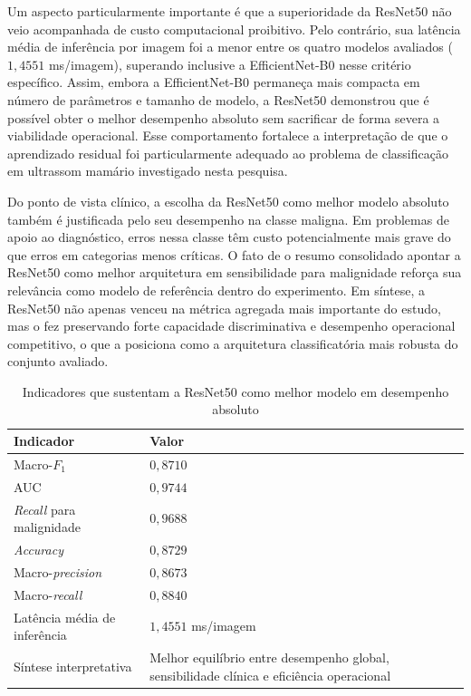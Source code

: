 \documentclass[tcc,capa]{texufpel}
\begin{document}
Um aspecto particularmente importante é que a superioridade da ResNet50 não veio acompanhada de custo computacional proibitivo. Pelo contrário, sua latência média de inferência por imagem foi a menor entre os quatro modelos avaliados (\(1{,}4551\) ms/imagem), superando inclusive a EfficientNet-B0 nesse critério específico. Assim, embora a EfficientNet-B0 permaneça mais compacta em número de parâmetros e tamanho de modelo, a ResNet50 demonstrou que é possível obter o melhor desempenho absoluto sem sacrificar de forma severa a viabilidade operacional. Esse comportamento fortalece a interpretação de que o aprendizado residual foi particularmente adequado ao problema de classificação em ultrassom mamário investigado nesta pesquisa.

Do ponto de vista clínico, a escolha da ResNet50 como melhor modelo absoluto também é justificada pelo seu desempenho na classe maligna. Em problemas de apoio ao diagnóstico, erros nessa classe têm custo potencialmente mais grave do que erros em categorias menos críticas. O fato de o resumo consolidado apontar a ResNet50 como melhor arquitetura em sensibilidade para malignidade reforça sua relevância como modelo de referência dentro do experimento. Em síntese, a ResNet50 não apenas venceu na métrica agregada mais importante do estudo, mas o fez preservando forte capacidade discriminativa e desempenho operacional competitivo, o que a posiciona como a arquitetura classificatória mais robusta do conjunto avaliado.

\begin{table}[htbp]
	\centering
	\caption{Indicadores que sustentam a ResNet50 como melhor modelo em desempenho absoluto}
	\label{tab:resnet50_melhor_modelo_absoluto}
	\begin{tabular}{|p{5.2cm}|p{8.8cm}|}
		\hline
		\textbf{Indicador} & \textbf{Valor} \\ \hline
		Macro-\(F_1\) & \(0{,}8710\) \\ \hline
		AUC & \(0{,}9744\) \\ \hline
		\textit{Recall} para malignidade & \(0{,}9688\) \\ \hline
		\textit{Accuracy} & \(0{,}8729\) \\ \hline
		Macro-\textit{precision} & \(0{,}8673\) \\ \hline
		Macro-\textit{recall} & \(0{,}8840\) \\ \hline
		Latência média de inferência & \(1{,}4551\) ms/imagem \\ \hline
		Síntese interpretativa & Melhor equilíbrio entre desempenho global, sensibilidade clínica e eficiência operacional \\ \hline
	\end{tabular}
\end{table}
\end{document}
